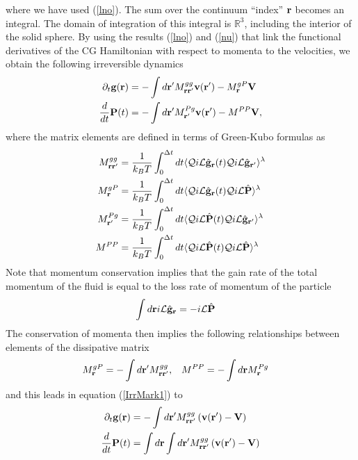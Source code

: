 \documentclass[b5paper,openright,10pt]{book}
\begin{document}
where we have  used (\ref{lno}). The sum over  the continuum ``index''
${\bf  r}$ becomes  an integral.   The domain  of integration  of this
integral  is  $\mathbb{R}^3$,  including  the interior  of  the  solid
sphere. By  using the  results (\ref{lno}) and  (\ref{nu}) that  link the
functional derivatives of  the CG Hamiltonian with  respect to momenta
to the velocities, we obtain the following irreversible dynamics
\begin{align}
  \partial_t{\bf g}({\bf r})&=-\int d{\bf r}'M^{gg}_{{\bf r}{\bf r}'}
{\bf v}({\bf r}')-M^{gP}_{\bf r}{\bf V}
\nonumber\\
\frac{d}{dt}{\bf P}(t)&=-\int d{\bf r}' M^{Pg}_{{\bf r}'}{\bf v}({\bf r}')-M^{PP}{\bf V},
\label{IrrMark1}\end{align}
where the matrix elements are  defined in terms of Green-Kubo formulas
as
\begin{align}
  M^{gg}_{{\bf r}{\bf r}'}&=\frac{1}{k_BT}\int_0^{\Delta t} dt\langle 
  {\cal Q}  i{\cal L}\hat{\bf g}_{{\bf r}}(t){\cal Q}  i{\cal L}\hat{\bf g}_{{\bf r}'}\rangle^\lambda
\nonumber\\
  M^{gP}_{{\bf r}}&=\frac{1}{k_BT}\int_0^{\Delta t} dt\langle 
{\cal Q}  i{\cal L}\hat{\bf g}_{\bf r}(t){\cal Q}  i{\cal L}\hat{\bf P}\rangle^\lambda
\nonumber\\
  M^{Pg}_{{\bf r}'}&=\frac{1}{k_BT}\int_0^{\Delta t} dt\langle 
{\cal Q}  i{\cal L}\hat{\bf P}(t){\cal Q}  i{\cal L}\hat{\bf g}_{{\bf r}'}\rangle^\lambda
\nonumber\\
  M^{PP}&=\frac{1}{k_BT}\int_0^{\Delta t} dt\langle 
{\cal Q}  i{\cal L}\hat{\bf P}(t){\cal Q}  i{\cal L}\hat{\bf P}\rangle^\lambda
\nonumber\\
\label{Ms}
\end{align}
Note that momentum conservation implies that the gain rate of the total momentum
of the fluid is equal to the loss rate of momentum of the particle
\begin{align}
  \int d{\bf r} i{\cal L}\hat{\bf g}_{\bf r}&=-i{\cal L}\hat{\bf P}
\label{iLgiLP}
\end{align}
The conservation of momenta then implies the following relationships between
elements of the dissipative matrix
\begin{align}
    M^{gP}_{{\bf r}}&=-\int d{\bf r}'M^{gg}_{{\bf r}{\bf r}'},&&
M^{PP}= - \int d{\bf r}M^{Pg}_{{\bf r}}
\end{align}
and this leads in equation (\ref{IrrMark1}) to 
\begin{align}
  \partial_t{\bf g}({\bf r})&=-\int d{\bf r}'M^{gg}_{{\bf r}{\bf r}'}\left({\bf v}({\bf r}')-{\bf V}\right)
\nonumber\\
\frac{d}{dt}{\bf P}(t)&=\int d{\bf r}\int d{\bf r}'M^{gg}_{{\bf r}{\bf r}'}\left({\bf v}({\bf r}')-{\bf V}\right)
\label{IrrMark2}\end{align}
\end{document}
